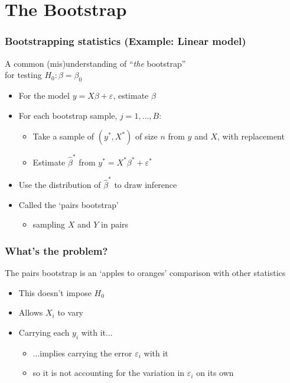 \documentclass{beamer}
\begin{document}


\section{The Bootstrap}



\begin{frame}
\frametitle{Bootstrapping statistics (Example: Linear model)}

A common (mis)understanding of ``\emph{the} bootstrap'' \\
for testing $H_0: \beta = \beta_0$
\begin{itemize}
    \item For the model $y = X\beta + \varepsilon$, estimate $\beta$
    \item For each bootstrap sample, $j = 1, \dots, B$:
    \begin{itemize}
        \item Take a sample of $(y^{*}, X^{*})$ of size $n$ from $y$ and $X$, with replacement
        \item Estimate $\hat{\beta}^{*}$ from $y^{*} = X^{*}\beta^{*} + \varepsilon^{*}$
    \end{itemize}
    \item Use the distribution of $\hat{\beta}^{*}$ to draw inference
    \item Called the `pairs bootstrap'
    \begin{itemize}
        \item sampling $X$ and $Y$ in pairs
    \end{itemize}
\end{itemize}


\end{frame}


\begin{frame}
\frametitle{What's the problem?}

The pairs bootstrap is an `apples to oranges' comparison with other statistics
\begin{itemize}
    \item This doesn't impose $H_0$
    \item Allows $X_i$ to vary
    \item Carrying each $y_i$ with it...
    \begin{itemize}
        \item ...implies carrying the error $\varepsilon_i$ with it
        \item so it is not accounting for the variation in $\varepsilon_i$ on its own
    \end{itemize}
\end{itemize}


\end{frame}
\end{document}
